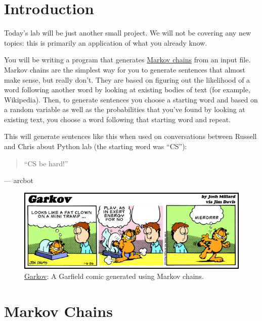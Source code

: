 \documentclass[11pt]{cselabheader}
\begin{document}
\pagebreak
\section{Introduction}

Today's lab will be just another small project.
We will not be covering any new
topics: this is primarily an application of what you already know. 

You will be
writing a program that generates
\href{http://en.wikipedia.org/wiki/Markov_chain}{Markov chains} from an input
file. Markov chains are the simplest way for you to generate sentences that
almost make sense, but really don't. They are based on figuring out the
likelihood of a word following another word by looking at existing bodies of
text (for example, Wikipedia). Then, to generate sentences you choose a starting
word and based on a random variable as well as the probabilities that you've
found by looking at existing text, you choose a word following that starting
word and repeat. 

This will generate sentences like this when used on conversations between
Russell and Chris about Python lab (the starting word was ``CS''):
\begin{quotation}
``CS be hard!''
\end{quotation}
\begin{flushright}
--- arcbot
\end{flushright}


\begin{figure}[!ht]
  \centering
  \includegraphics[width=\linewidth]{img/garkov}
  \caption*{\href{http://joshmillard.com/garkov/}{Garkov}:
    A Garfield comic generated using Markov chains.}
  \label{garkov}
\end{figure}


\pagebreak

\section{Markov Chains}
\label{sec:markov}
\end{document}
